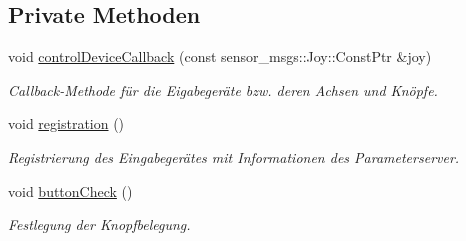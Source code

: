 \subsection*{Private Methoden}
\begin{DoxyCompactItemize}
\item 
void \hyperlink{classControlDevice_a30fb0b63f5807af4c0c27b3e3dd837e8}{control\-Device\-Callback} (const sensor\-\_\-msgs\-::\-Joy\-::\-Const\-Ptr \&joy)
\begin{DoxyCompactList}\small\item\em Callback-\/\-Methode für die Eigabegeräte bzw. deren Achsen und Knöpfe. \end{DoxyCompactList}\item 
\hypertarget{classControlDevice_a54555a7b2c3913f4401839d66d6434c4}{void \hyperlink{classControlDevice_a54555a7b2c3913f4401839d66d6434c4}{registration} ()}\label{classControlDevice_a54555a7b2c3913f4401839d66d6434c4}

\begin{DoxyCompactList}\small\item\em Registrierung des Eingabegerätes mit Informationen des Parameterserver. \end{DoxyCompactList}\item 
\hypertarget{classControlDevice_a461ef41cef8de1e7c0a0877a260f8a1b}{void \hyperlink{classControlDevice_a461ef41cef8de1e7c0a0877a260f8a1b}{button\-Check} ()}\label{classControlDevice_a461ef41cef8de1e7c0a0877a260f8a1b}

\begin{DoxyCompactList}\small\item\em Festlegung der Knopfbelegung. \end{DoxyCompactList}\end{DoxyCompactItemize}
